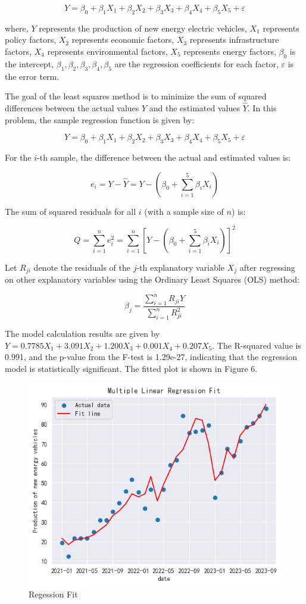 \documentclass{apmcmthesis}
\begin{document}
\[ Y = \beta_0 + \beta_1X_1 + \beta_2X_2 + \beta_3X_3 + \beta_4X_4 + \beta_5X_5 + \varepsilon \]

where,
\( Y \) represents the production of new energy electric vehicles,
\( X_1 \) represents policy factors,
\( X_2 \) represents economic factors,
\( X_3 \) represents infrastructure factors,
\( X_4 \) represents environmental factors,
\( X_5 \) represents energy factors,
\( \beta_0 \) is the intercept,
\( \beta_1, \beta_2, \beta_3, \beta_4, \beta_5 \) are the regression coefficients for each factor,
\( \varepsilon \) is the error term.

The goal of the least squares method is to minimize the sum of squared differences between the actual values \( Y \) and the estimated values \( \hat{Y} \). In this problem, the sample regression function is given by:

\[ Y = \beta_0 + \beta_1X_1 + \beta_2X_2 + \beta_3X_3 + \beta_4X_4 + \beta_5X_5 + \varepsilon \]

For the \( i \)-th sample, the difference between the actual and estimated values is:

\[ e_i = Y - \hat{Y} = Y - (\beta_0 + \sum_{i=1}^{5}\beta_iX_i) \]

The sum of squared residuals for all \( i \) (with a sample size of \( n \)) is:

\[ Q = \sum_{i=1}^ne_i^2 = \sum_{i=1}^{n}[ Y - (\beta_0 + \sum_{i=1}^{5}\beta_iX_i)]^2 \]

Let \( R_{ji} \) denote the residuals of the \( j \)-th explanatory variable \( X_j \) after regressing on other explanatory variables using the Ordinary Least Squares (OLS) method:

\[ \beta_j = \frac{\sum_{i=1}^{n}R_{ji}Y}{\sum_{i=1}^{n}R_{ji}^2} \]

The model calculation results are given by \( Y = 0.7785X_1 + 3.091X_2 + 1.200X_3 + 0.001X_4 + 0.207X_5 \). The R-squared value is 0.991, and the p-value from the F-test is 1.29e-27, indicating that the regression model is statistically significant. The fitted plot is shown in Figure 6.
\begin{figure}[h]
    \centering
    \includegraphics[scale=1]{figures/Figure/问题一/Regession Fit.png}
    \caption{Regession Fit}
\end{figure}
\end{document}

